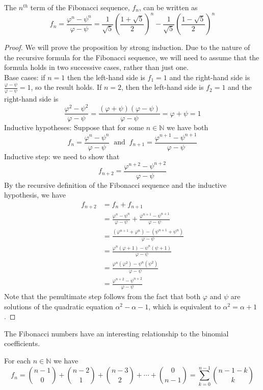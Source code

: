 \documentclass[handout]{ximera}
\begin{document}
\begin{proposition}
The $n^{th}$ term of the Fibonacci sequence, $f_n$, can be written as 
\[
f_n = \frac{\varphi^n - \psi^n}{\varphi - \psi} = 
\frac{1}{\sqrt 5} \left(\frac{1+\sqrt 5}{2}\right)^n - \frac{1}{\sqrt 5} \left(\frac{1-\sqrt 5}{2}\right)^n
\]
\end{proposition}
\begin{proof}
We will prove the proposition by strong induction. Due to the nature of the recursive formula for the Fibonacci sequence, 
we will need to assume that the formula holds in two successive cases, rather than just one.\\
Base cases: if $n=1$ then the left-hand side is $f_1 =1$ and the right-hand side is $\frac{\varphi - \psi}{\varphi - \psi} = 1$, 
so the result holds. If $n=2$, then the left-hand side is $f_2 =1$ and the right-hand side is
\[
\frac{\varphi^2 - \psi^2}{\varphi - \psi} =\frac{(\varphi + \psi)(\varphi - \psi)}{\varphi - \psi} = \varphi + \psi = 1
\]
Inductive hypotheses: Suppose that for some $n \in \mathbb{N}$ we have both
\[
f_n = \frac{\varphi^n - \psi^n}{\varphi - \psi} \;\; \text{and} \;\; f_{n+1} = \frac{\varphi^{n+1} - \psi^{n+1}}{\varphi - \psi}
\]
Inductive step: we need to show that
\[
f_{n+2} = \frac{\varphi^{n+2} - \psi^{n+2}}{\varphi - \psi}
\]
By the recursive definition of the Fibonacci sequence and the inductive hypothesis, we have
\begin{align*}
f_{n+2} &= f_{n} + f_{n+1}\\
  & = \frac{\varphi^n - \psi^n}{\varphi - \psi} + \frac{\varphi^{n+1} - \psi^{n+1}}{\varphi - \psi}\\
  &= \frac{(\varphi^{n+1} + \varphi^n) - (\psi^{n+1}+ \psi^n)}{\varphi - \psi}\\
  &= \frac{\varphi^n(\varphi + 1) - \psi^n(\psi + 1 )}{\varphi - \psi}\\
  &= \frac{\varphi^n(\varphi ^2) - \psi^n(\psi^2 )}{\varphi - \psi}\\
  &= \frac{\varphi^{n+2}  - \psi^{n+2}}{\varphi - \psi}
\end{align*}
Note that the penultimate step follows from the fact that both $\varphi$ and $\psi$ are solutions of the quadratic equation
$\alpha^2 - \alpha - 1$, which is equivalent to $\alpha^2 = \alpha + 1$.
\end{proof}


The Fibonacci numbers have an interesting relationship to the binomial coefficients.

\begin{proposition}
For each $n \in \mathbb{N}$ we have
\[
f_n = \binom{n-1}{0} + \binom{n-2}{1} + \binom{n-3}{2} + \cdots + \binom{0}{n-1} = \sum_{k=0}^{n-1} \binom{n-1-k}{k}
\]

\end{proposition}
\end{document}
